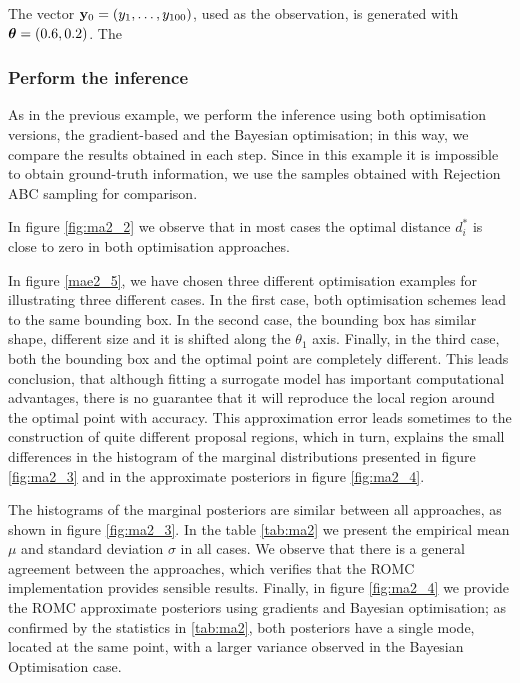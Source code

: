 The vector $\mathbf{y}_0 = (y_1, \ldots, y_{100})$, used as the observation,
is generated with $\boldsymbol{\theta}=(0.6, 0.2)$. The 


\subsubsection*{Perform the inference}

As in the previous example, we perform the inference using both
optimisation versions, the gradient-based and the Bayesian
optimisation; in this way, we compare the results obtained in each
step. Since in this example it is impossible to obtain ground-truth
information, we use the samples obtained with Rejection ABC sampling
for comparison.

In figure \ref{fig:ma2_2} we observe that in most cases the optimal
distance $d_i^*$ is close to zero in both optimisation approaches.

In figure \ref{mae2_5}, we have chosen three different optimisation
examples for illustrating three different cases. In the first case,
both optimisation schemes lead to the same bounding box. In the second
case, the bounding box has similar shape, different size and it is
shifted along the $\theta_1$ axis. Finally, in the third case, both
the bounding box and the optimal point are completely different. This
leads conclusion, that although fitting a surrogate model has
important computational advantages, there is no guarantee that it will
reproduce the local region around the optimal point with
accuracy. This approximation error leads sometimes to the construction
of quite different proposal regions, which in turn, explains the small
differences in the histogram of the marginal distributions presented
in figure \ref{fig:ma2_3} and in the approximate posteriors in figure
\ref{fig:ma2_4}.

The histograms of the marginal posteriors are similar between all
approaches, as shown in figure \ref{fig:ma2_3}. In the table
\ref{tab:ma2} we present the empirical mean $\mu$ and standard
deviation $\sigma$ in all cases. We observe that there is a general
agreement between the approaches, which verifies that the ROMC
implementation provides sensible results. Finally, in figure
\ref{fig:ma2_4} we provide the ROMC approximate posteriors using
gradients and Bayesian optimisation; as confirmed by the statistics in
\ref{tab:ma2}, both posteriors have a single mode, located at the same
point, with a larger variance observed in the Bayesian Optimisation
case.

